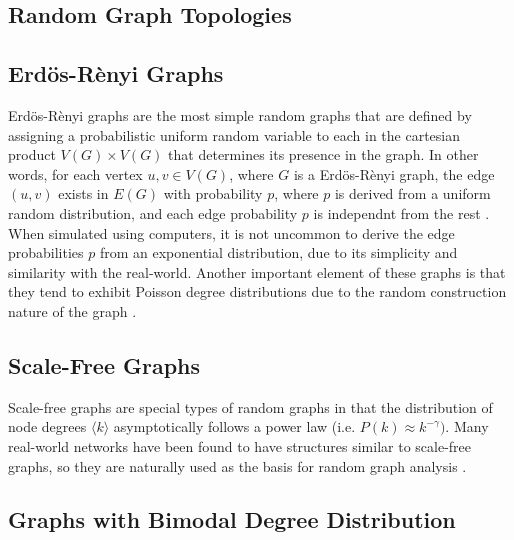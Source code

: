 \documentclass[doc]{apa}%
\begin{document}
\subsection{Random Graph Topologies}


\subsection{Erd\"{o}s-R\`{e}nyi Graphs}
Erd\"{o}s-R\`{e}nyi graphs are the most simple random graphs that are defined by assigning a probabilistic uniform random variable to each in the cartesian product $V(G) \times V(G)$ that determines its presence in the graph. In other words, for each vertex $u, v \in V(G)$, where $G$ is a Erd\"{o}s-R\`{e}nyi graph, the edge $(u,v)$ exists in $E(G)$ with probability $p$, where $p$ is derived from a uniform random distribution, and each edge probability $p$ is independnt from the rest \cite{LargeNetworkRobustness-PVM}. When simulated using computers, it is not uncommon to derive the edge probabilities $p$ from an exponential distribution, due to its simplicity and similarity with the real-world. Another important element of these graphs is that they tend to exhibit Poisson degree distributions due to the random construction nature of the graph \cite{bimodal}.


\subsection{Scale-Free Graphs}
Scale-free graphs are special types of random graphs in that the distribution of node degrees $\langle k \rangle$ asymptotically follows a power law (i.e. $P(k) \approx k^{-\gamma})$. Many real-world networks have been found to have structures similar to scale-free graphs, so they are naturally used as the basis for random graph analysis \cite{AttacksWavesRandom}. 


\subsection{Graphs with Bimodal Degree Distribution}
\end{document}
